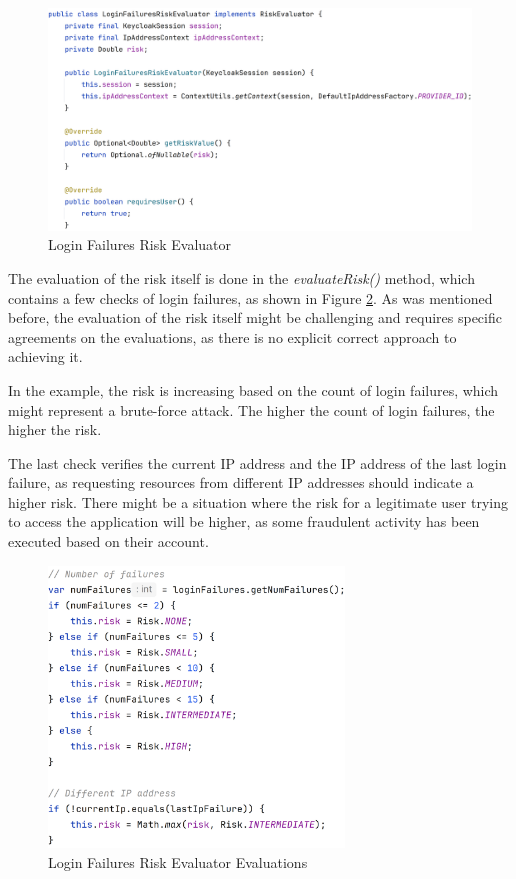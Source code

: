 \begin{figure}[htbp]
  \centering
  \includegraphics[width=1\textwidth]{img/sections/6-implementation/loginFailures.png}
  \caption{Login Failures Risk Evaluator}
  \label{fig:impl-risk-evaluator-login-failures}
\end{figure}

The evaluation of the risk itself is done in the \textit{evaluateRisk()} method, which contains a few checks of login failures, as shown in Figure \ref{fig:impl-risk-evaluator-login-failures-evaluations}.
As was mentioned before, the evaluation of the risk itself might be challenging and requires specific agreements on the evaluations, as there is no explicit correct approach to achieving it.

In the example, the risk is increasing based on the count of login failures, which might represent a brute-force attack.
The higher the count of login failures, the higher the risk.

\newpage
The last check verifies the current IP address and the IP address of the last login failure, as requesting resources from different IP addresses should indicate a higher risk.
There might be a situation where the risk for a legitimate user trying to access the application will be higher, as some fraudulent activity has been executed based on their account. 

\begin{figure}[htbp]
  \centering
  \includegraphics[width=0.7\textwidth]{img/sections/6-implementation/loginFailuresEvals.png}
  \caption{Login Failures Risk Evaluator Evaluations}
  \label{fig:impl-risk-evaluator-login-failures-evaluations}
\end{figure}

